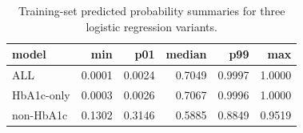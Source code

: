 \begin{table}[H]
\begin{center}
\begin{tabular}{lrrrrr}
\toprule
model & min & p01 & median & p99 & max \\
\midrule
ALL & 0.0001 & 0.0024 & 0.7049 & 0.9997 & 1.0000 \\
HbA1c-only & 0.0003 & 0.0026 & 0.7067 & 0.9996 & 1.0000 \\
non-HbA1c & 0.1302 & 0.3146 & 0.5885 & 0.8849 & 0.9519 \\
\bottomrule
\end{tabular}
\end{center}
\vspace{-5pt}
\caption{Training-set predicted probability summaries for three logistic regression variants.}
\label{tab:logit_train_prob_summary}
\end{table}
